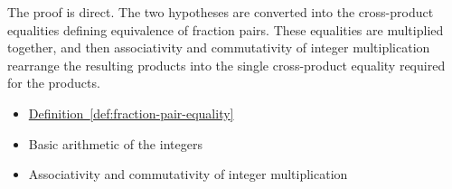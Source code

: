 \begin{remark*}
The proof is direct. The two hypotheses are converted into the
cross-product equalities defining equivalence of fraction pairs. These
equalities are multiplied together, and then associativity and commutativity
of integer multiplication rearrange the resulting products into the single
cross-product equality required for the products.
\end{remark*}

\begin{dependencies}
\begin{itemize}
  \item \hyperref[def:fraction-pair-equality]{Definition~\ref*{def:fraction-pair-equality}}
  \item Basic arithmetic of the integers
  \item Associativity and commutativity of integer multiplication
\end{itemize}
\end{dependencies}

\clearpage
